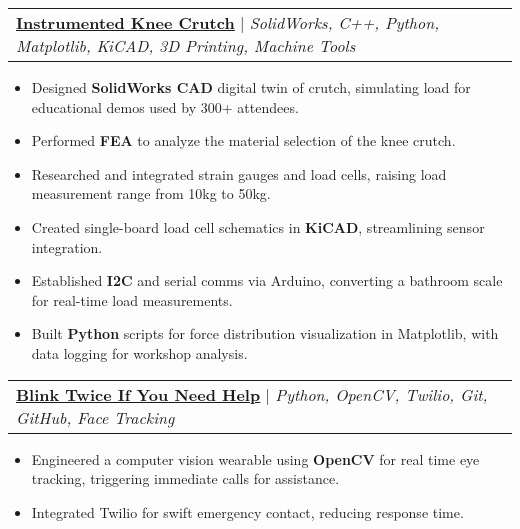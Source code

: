 \documentclass[letterpaper]{article}
\makeatletter
\newcommand{\resumeItem}[1]{
  \item\small{
    {#1 \vspace{-2pt}}
  }
}
\newcommand{\resumeProjectHeading}[2]{
    \item
    \begin{tabular*}{0.97\textwidth}{l@{\extracolsep{\fill}}r}
      \small#1 & #2 \\
    \end{tabular*}\vspace{-7pt}
}
\newcommand{\resumeItemListStart}{\begin{itemize}}
\newcommand{\resumeItemListEnd}{\end{itemize}\vspace{-5pt}}
\makeatother
\begin{document}

\resumeProjectHeading
{\textbf{\href{https://www.youtube.com/playlist?list=PL2zKq55_kXLcBZ80Y-t7BwzdXdnPQslFN}{\underline{Instrumented Knee Crutch}}} $|$ \emph{SolidWorks, C++, Python, Matplotlib, KiCAD, 3D Printing, Machine Tools}}{}
\resumeItemListStart
\resumeItem{Designed \textbf{SolidWorks CAD} digital twin of crutch, simulating load for educational demos used by 300+ attendees.}
\resumeItem{Performed \textbf{FEA} to analyze the material selection of the knee crutch.}
\resumeItem{Researched and integrated strain gauges and load cells, raising load measurement range from 10kg to 50kg.}
\resumeItem{Created single-board load cell schematics in \textbf{KiCAD}, streamlining sensor integration.}
\resumeItem{Established \textbf{I2C} and serial comms via Arduino, converting a bathroom scale for real-time load measurements.}
\resumeItem{Built \textbf{Python} scripts for force distribution visualization in Matplotlib, with data logging for workshop analysis.}
\resumeItemListEnd


\resumeProjectHeading
{\textbf{\href{https://devpost.com/software/blink-twice-if-you-need-help}{\underline{Blink Twice If You Need Help}}} $|$ \emph{Python, OpenCV, Twilio, Git, GitHub, Face Tracking}}{}
\resumeItemListStart
\resumeItem{Engineered a computer vision wearable using \textbf{OpenCV} for real time eye tracking, triggering immediate calls for assistance.}
\resumeItem{Integrated Twilio for swift emergency contact, reducing response time.}
\resumeItemListEnd
\end{document}
